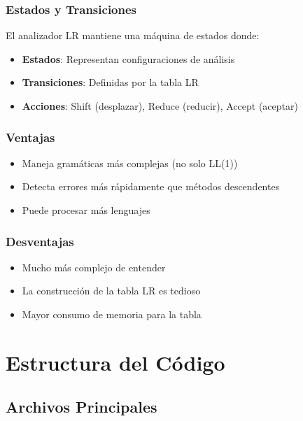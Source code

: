 \documentclass[12pt]{article}
\begin{document}
\subsubsection{Estados y Transiciones}

El analizador LR mantiene una máquina de estados donde:
\begin{itemize}
    \item \textbf{Estados}: Representan configuraciones de análisis
    \item \textbf{Transiciones}: Definidas por la tabla LR
    \item \textbf{Acciones}: Shift (desplazar), Reduce (reducir), Accept (aceptar)
\end{itemize}

\subsubsection{Ventajas}

\begin{itemize}
    \item Maneja gramáticas más complejas (no solo LL(1))
    \item Detecta errores más rápidamente que métodos descendentes
    \item Puede procesar más lenguajes
\end{itemize}

\subsubsection{Desventajas}

\begin{itemize}
    \item Mucho más complejo de entender
    \item La construcción de la tabla LR es tedioso
    \item Mayor consumo de memoria para la tabla
\end{itemize}

\section{Estructura del Código}

\subsection{Archivos Principales}
\end{document}
